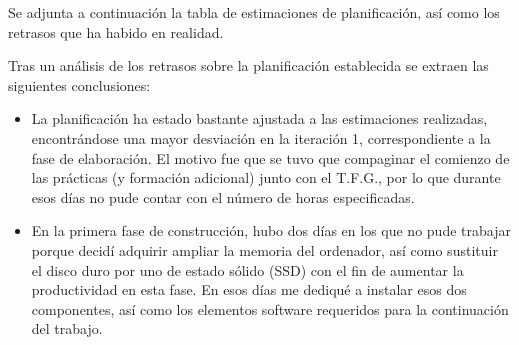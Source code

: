 \documentclass[twoside]{report}
\begin{document}
Se adjunta a continuación la tabla de estimaciones de planificación, así como los retrasos que ha habido en realidad.

\begin{table}[H]
\centering
{}
\caption{Desviaciones sobre el calendario planificado}
\end{table}

Tras un análisis de los retrasos sobre la planificación establecida se extraen las siguientes conclusiones:
\begin{itemize}

\item La planificación ha estado bastante ajustada a las estimaciones realizadas, encontrándose una mayor desviación en la iteración 1, correspondiente a la fase de elaboración. El motivo fue que se tuvo que compaginar el comienzo de las prácticas (y formación adicional) junto con el T.F.G., por lo que durante esos días no pude contar con el número de horas especificadas.

\item En la primera fase de construcción, hubo dos días en los que no pude trabajar porque decidí adquirir ampliar la memoria del ordenador, así como sustituir el disco duro por uno de estado sólido (SSD) con el fin de aumentar la productividad en esta fase. En esos días me dediqué a instalar esos dos componentes, así como los elementos software requeridos para la continuación del trabajo.

\end{itemize}
\end{document}
